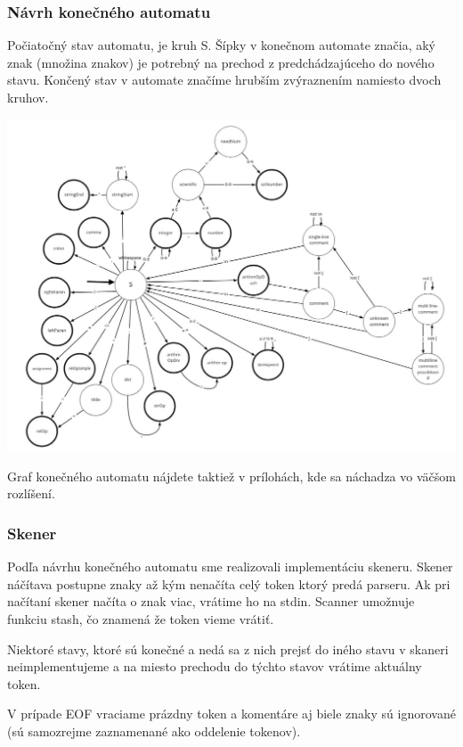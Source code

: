 \documentclass[a4paper, 12pt]{article}
\begin{document}
\subsubsection{Návrh konečného automatu}

Počiatočný stav automatu, je kruh S. Šípky v konečnom automate značia, aký znak (množina znakov) je potrebný na prechod z predchádzajúceho do nového stavu. Končený stav v automate značíme hrubším zvýraznením namiesto dvoch kruhov.

\begin{center}
    \includegraphics[scale=0.49]{fsm.png}
\end{center}

Graf konečného automatu nájdete taktiež v prílohách, kde sa náchadza vo väčšom rozlíšení.


\subsubsection{Skener}
Podľa návrhu konečného automatu sme realizovali implementáciu skeneru. Skener náčítava postupne znaky až kým nenačíta celý token ktorý predá parseru. Ak pri načítaní skener načíta o znak viac, vrátime ho na stdin. Scanner umožnuje funkciu stash, čo znamená že token vieme vrátiť.

Niektoré stavy, ktoré sú konečné a nedá sa z nich prejsť do iného stavu v skaneri neimplementujeme a na miesto prechodu do týchto stavov vrátime aktuálny token.

V prípade EOF vraciame prázdny token a komentáre aj biele znaky sú ignorované (sú samozrejme zaznamenané ako oddelenie tokenov).
\end{document}
